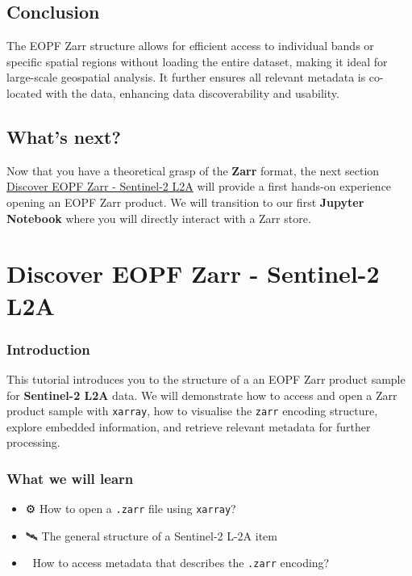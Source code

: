 \documentclass[
  letterpaper,
  DIV=11,
  numbers=noendperiod]{scrreprt}
\providecommand{\tightlist}{%
  \setlength{\itemsep}{0pt}\setlength{\parskip}{0pt}}
\begin{document}
\section{Conclusion}\label{conclusion-3}

The EOPF Zarr structure allows for efficient access to individual bands
or specific spatial regions without loading the entire dataset, making
it ideal for large-scale geospatial analysis. It further ensures all
relevant metadata is co-located with the data, enhancing data
discoverability and usability.

\section{What's next?}\label{whats-next-3}

Now that you have a theoretical grasp of the \textbf{Zarr} format, the
next section \href{./22_zarr_struct_S2L2A.ipynb}{Discover EOPF Zarr -
Sentinel-2 L2A} will provide a first hands-on experience opening an EOPF
Zarr product. We will transition to our first \textbf{Jupyter Notebook}
where you will directly interact with a Zarr store.

\chapter{Discover EOPF Zarr - Sentinel-2
L2A}\label{discover-eopf-zarr---sentinel-2-l2a}

\subsection{Introduction}\label{introduction-4}

This tutorial introduces you to the structure of a an EOPF Zarr product
sample for \textbf{Sentinel-2 L2A} data. We will demonstrate how to
access and open a Zarr product sample with \texttt{xarray}, how to
visualise the \texttt{zarr} encoding structure, explore embedded
information, and retrieve relevant metadata for further processing.

\subsection{What we will learn}\label{what-we-will-learn-3}

\begin{itemize}
\tightlist
\item
  ⚙️ How to open a \texttt{.zarr} file using \texttt{xarray}?
\item
  🛰️ The general structure of a Sentinel-2 L-2A item
\item
  🔎 How to access metadata that describes the \texttt{.zarr} encoding?
\end{itemize}
\end{document}
